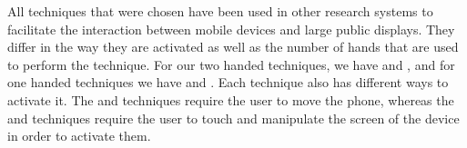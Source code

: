 All techniques that were chosen have been used in other research systems to facilitate the interaction between mobile devices and large public displays.
They differ in the way they are activated as well as the number of hands that are used to perform the technique.
For our two handed techniques, we have \throw and \grab, and for one handed techniques we have \tilt and \swipe. 
Each technique also has different ways to activate it. 
The \throw and \tilt techniques require the user to move the phone, whereas the \swipe and \grab techniques require the user to touch and manipulate the screen of the device in order to activate them. 
